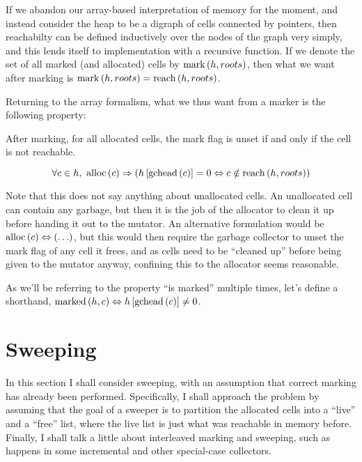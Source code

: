 If we abandon our array-based interpretation of memory for the moment,
and instead consider the \gls{heap} to be a digraph of \glspl{cell}
connected by \glspl{pointer}, then reachabilty can be defined
inductively over the nodes of the graph very simply, and this lends
itself to implementation with a recursive function. If we denote the
set of all marked (and allocated) cells by $\mathrm{mark}\left(h, roots\right)$, then
what we want after marking is $\mathrm{mark}\left(h, roots\right) = \mathrm{reach}\left(h, roots\right)$.

Returning to the array formalism, what we thus want from a marker is
the following property:

\begin{definition}
  After marking, for all allocated \glspl{cell}, the mark flag is
  unset if and only if the \gls{cell} is not reachable.

  \[\forall c \in h,\ \mathrm{alloc}\left(c\right) \Rightarrow
  \left(h\left[\mathrm{gchead}\left(c\right)\right] = 0 \Leftrightarrow c \notin
    \mathrm{reach}\left(h, roots\right)\right)\]
\end{definition}

Note that this does not say anything about unallocated
\glspl{cell}. An unallocated \gls{cell} can contain any garbage, but
then it is the job of the allocator to clean it up before handing it
out to the \gls{mutator}. An alternative formulation would be
$\mathrm{alloc}\left(c\right) \Leftrightarrow \left(\ldots\right)$, but this would then require the
\gls{garbage collector} to unset the mark flag of any \gls{cell} it
frees, and as \glspl{cell} need to be ``cleaned up'' before being
given to the \gls{mutator} anyway, confining this to the allocator
seems reasonable.

As we'll be referring to the property ``is marked'' multiple times,
let's define a shorthand, $\mathrm{marked}\left(h, c\right) \Leftrightarrow h\left[\mathrm{gchead}\left(c\right)\right]
\neq 0$.

\section{Sweeping}


In this section I shall consider sweeping, with an assumption that
correct marking has already been performed. Specifically, I shall
approach the problem by assuming that the goal of a sweeper is to
partition the allocated cells into a ``live'' and a ``free'' list,
where the live list is just what was reachable in memory
before. Finally, I shall talk a little about interleaved marking and
sweeping, such as happens in some incremental and other special-case
collectors.

